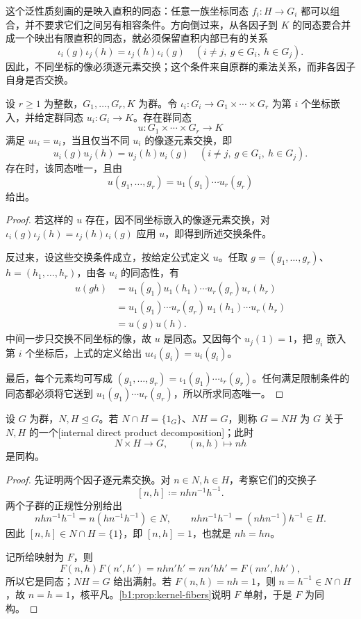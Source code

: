 这个泛性质刻画的是映入直积的同态：任意一族坐标同态 \(f_i:H\rightarrow G_i\) 都可以组合，并不要求它们之间另有相容条件。方向倒过来，从各因子到 \(K\) 的同态要合并成一个映出有限直积的同态，就必须保留直积内部已有的关系
\[
	\iota_i(g)\iota_j(h)=\iota_j(h)\iota_i(g) \quad(i\ne j,\ g\in G_i,\ h\in G_j).
\]
因此，不同坐标的像必须逐元素交换；这个条件来自原群的乘法关系，而非各因子自身是否交换。

\begin{proposition}[从有限直积出发的同态]\label{b1:prop:finite-product-maps}
	设 \(r\geq1\) 为整数，\(G_1,\ldots,G_r,K\) 为群。令 \(\iota_i:G_i\rightarrow G_1\times\cdots\times G_r\) 为第 \(i\) 个坐标嵌入，并给定群同态 \(u_i:G_i\rightarrow K\)。存在群同态
	\[
		u:G_1\times\cdots\times G_r\longrightarrow K
	\]
	满足 \(u\iota_i=u_i\)，当且仅当不同 \(u_i\) 的像逐元素交换，即
	\[
		u_i(g)u_j(h)=u_j(h)u_i(g) \quad(i\neq j,\ g\in G_i,\ h\in G_j).
	\]
	存在时，该同态唯一，且由
	\[
		u(g_1,\ldots,g_r)=u_1(g_1)\cdots u_r(g_r)
	\]
	给出。
\end{proposition}
\begin{proof}
	若这样的 \(u\) 存在，因不同坐标嵌入的像逐元素交换，对 \(\iota_i(g)\iota_j(h)=\iota_j(h)\iota_i(g)\) 应用 \(u\)，即得到所述交换条件。

	反过来，设这些交换条件成立，按给定公式定义 \(u\)。任取 \(g=(g_1,\ldots,g_r)\)、\(h=(h_1,\ldots,h_r)\)，由各 \(u_i\) 的同态性，有
	\[
		\begin{aligned}
			u(gh) &=u_1(g_1)u_1(h_1)\cdots u_r(g_r)u_r(h_r)\\
			&=u_1(g_1)\cdots u_r(g_r)\,u_1(h_1)\cdots u_r(h_r)\\
			&=u(g)u(h).
		\end{aligned}
	\]
	中间一步只交换不同坐标的像，故 \(u\) 是同态。又因每个 \(u_j(1)=1\)，把 \(g_i\) 嵌入第 \(i\) 个坐标后，上式的定义给出 \(u\iota_i(g_i)=u_i(g_i)\)。

	最后，每个元素均可写成 \((g_1,\ldots,g_r)=\iota_1(g_1)\cdots\iota_r(g_r)\)。任何满足限制条件的同态都必须将它送到 \(u_1(g_1)\cdots u_r(g_r)\)，所以所求同态唯一。
\end{proof}

\begin{proposition}[内直积判别]\label{b1:prop:internal-direct-product}
	设 \(G\) 为群，\(N,H\trianglelefteq G\)。若 \(N\cap H=\{1_G\}\)、\(NH=G\)，则称 \(G=NH\) 为 \(G\) 关于 \(N,H\) 的一个[internal direct product decomposition]；此时
	\[
		N\times H\longrightarrow G,\qquad(n,h)\longmapsto nh
	\]
	是同构。
\end{proposition}
\begin{proof}
	先证明两个因子逐元素交换。对 \(n\in N,h\in H\)，考察它们的交换子
	\[
		[n,h]\coloneqq nhn^{-1}h^{-1}.
	\]
	两个子群的正规性分别给出
	\[
		nhn^{-1}h^{-1}=n(hn^{-1}h^{-1})\in N, \qquad nhn^{-1}h^{-1}=(nhn^{-1})h^{-1}\in H.
	\]
	因此 \([n,h]\in N\cap H=\{1\}\)，即 \([n,h]=1\)，也就是 \(nh=hn\)。

	记所给映射为 \(F\)，则
	\[
		F(n,h)F(n',h')=nhn'h'=nn'hh'=F(nn',hh'),
	\]
	所以它是同态；\(NH=G\) 给出满射。若 \(F(n,h)=nh=1\)，则 \(n=h^{-1}\in N\cap H\)，故 \(n=h=1\)，核平凡。\cref{b1:prop:kernel-fibers}说明 \(F\) 单射，于是 \(F\) 为同构。
\end{proof}

